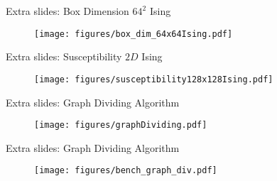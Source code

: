 \documentclass[10pt]{beamer}
\begin{document}
\appendix

\begin{frame}[fragile]{Extra slides: Box Dimension $64^2$ Ising}
    \begin{figure}[h!]
        \centering
            \texttt{[image: figures/box\_dim\_64x64Ising.pdf]}
    \end{figure}
\end{frame}

\begin{frame}[fragile]{Extra slides: Susceptibility $2D$ Ising}
    \begin{figure}[h!]
        \centering
            \texttt{[image: figures/susceptibility128x128Ising.pdf]}
    \end{figure}
\end{frame}


\begin{frame}[fragile]{Extra slides: Graph Dividing Algorithm}
    \begin{figure}[h!]
        \centering
            \texttt{[image: figures/graphDividing.pdf]}
    \end{figure}
\end{frame}

\begin{frame}[fragile]{Extra slides: Graph Dividing Algorithm}
    \begin{figure}[h!]
        \centering
            \texttt{[image: figures/bench\_graph\_div.pdf]}
    \end{figure}
\end{frame}
\end{document}
